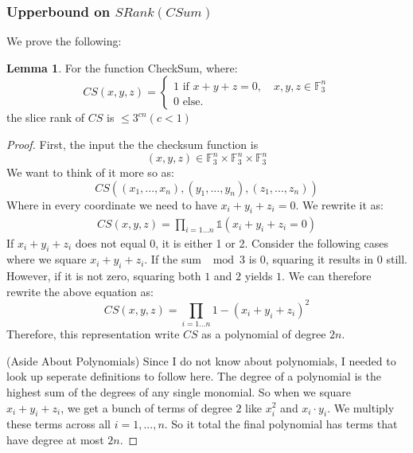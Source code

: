 \documentclass[11pt]{article}
\theoremstyle{definition}
\newtheorem{lemma}[theorem]{Lemma}
\begin{document}
\subsubsection{Upperbound on $SRank(CSum)$}
We prove the following:
\begin{lemma}
    For the function CheckSum, where:
    $$CS(x,y,z) = \begin{cases}
    1 \text{ if } x+y+z=0,\quad x,y,z \in \mathbb{F}_3^n\\
    0 \text{ else.}
    \end{cases}$$
    the slice rank of $CS$ is $\leq 3^{cn} (c < 1)$
\end{lemma}
\begin{proof}
    First, the input the the checksum function is $$(x,y,z) \in \mathbb{F}_3^n \times \mathbb{F}_3^n \times \mathbb{F}_3^n$$We want to think of it more so as:
    $$CS((x_1,...,x_n), (y_1,...,y_n),(z_1,...,z_n))$$
    Where in every coordinate we need to have $x_i + y_i + z_i = 0$. We rewrite it as:
    \begin{align*}
        CS(x,y,z) = \prod_{i=1...n} \mathds{1}(x_i + y_i + z_i = 0)
    \end{align*}
    If $x_i + y_i + z_i$ does not equal $0$, it is either 1 or 2. Consider the following cases where we square $x_i + y_i + z_i$. If the sum $\mod 3$ is 0, squaring it results in 0 still. However, if it is not zero, squaring both $1$ and $2$ yields $1$. We can therefore rewrite the above equation as:
    $$CS(x,y,z) = \prod_{i=1...n} 1-(x_i+y_i+z_i)^2$$
    Therefore, this representation write $CS$ as a polynomial of degree $2n$.
    \bigskip

    (Aside About Polynomials) Since I do not know about polynomials, I needed to look up seperate definitions to follow here. The degree of a polynomial is the highest sum of the degrees of any single monomial. So when we square $x_i + y_i + z_i$, we get a bunch of terms of degree $2$ like $x_i^2$ and $x_i \cdot y_i$. We multiply these terms across all $i=1,...,n$. So it total the final polynomial has terms that have degree at most $2n$.
    \bigskip


\end{proof}
\end{document}
